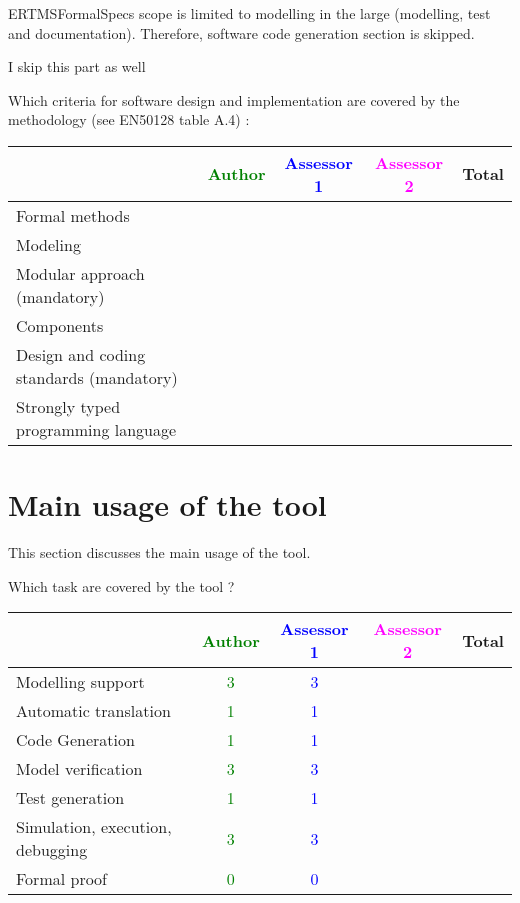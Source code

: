 \begin{author_comment}
ERTMSFormalSpecs scope is limited to modelling in the large (modelling, test and documentation). Therefore, software code generation section is skipped.  
\end{author_comment}

\begin{assessor1}
I skip this part as well
\end{assessor1}

Which criteria for software design and implementation are covered by the methodology
(see EN50128 table A.4) :

\begin{tabular}{|l | c | c | c | c|}
\hline
& \textcolor{green}{Author} & \textcolor{blue}{Assessor 1} & \textcolor{magenta}{Assessor 2} & Total \\
\hline
Formal methods  & & & &  \\
\hline 
Modeling  & & & &  \\
\hline
Modular approach (mandatory) & & & &  \\
\hline
Components & & & &  \\
\hline
Design and coding standards (mandatory) & & & &  \\
\hline
Strongly typed programming language & & & &  \\
\hline

\end{tabular}

\section{Main usage of the tool}
\label{main_usage}

This section discusses the main usage of the tool.

Which task are covered by the tool ?

\begin{tabular}{|l | c | c | c | c|}
\hline
& \textcolor{green}{Author} & \textcolor{blue}{Assessor 1} & \textcolor{magenta}{Assessor 2} & Total \\
\hline 
Modelling support & \textcolor{green}{3} & \textcolor{blue}{3} & &  \\
\hline
Automatic translation  & \textcolor{green}{1} & \textcolor{blue}{1} & & \\
\hline
Code Generation  & \textcolor{green}{1} & \textcolor{blue}{1} & & \\
\hline
Model verification & \textcolor{green}{3} & \textcolor{blue}{3} & & \\
\hline
Test generation & \textcolor{green}{1} & \textcolor{blue}{1} & & \\
\hline
Simulation, execution, debugging & \textcolor{green}{3} & \textcolor{blue}{3} & & \\
\hline
Formal proof & \textcolor{green}{0} & \textcolor{blue}{0} & & \\
\hline
\end{tabular}

